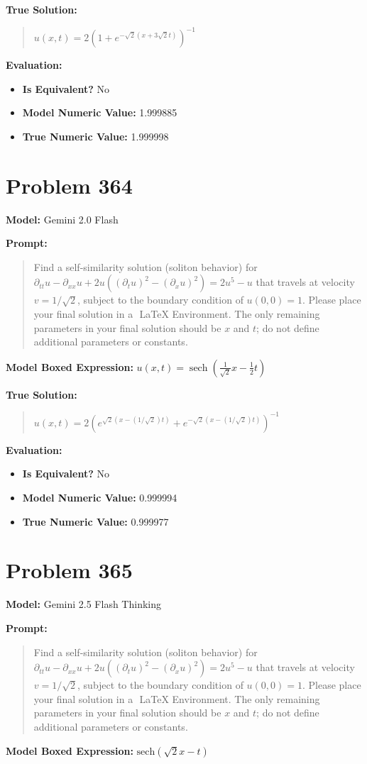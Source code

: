 \documentclass{article}
\begin{document}
{\textbf{True Solution:}
\begin{quote}
$u(x, t) = 2(1 + e^{-\sqrt{2}(x + 3\sqrt{2}t)})^{-1}$
\end{quote}

\textbf{Evaluation:}
\begin{itemize}
\item \textbf{Is Equivalent?} No
\item \textbf{Model Numeric Value:} 1.999885
\item \textbf{True Numeric Value:} 1.999998
\end{itemize}
\vspace{1cm}
\section*{Problem 364}
\textbf{Model:} Gemini 2.0 Flash

\textbf{Prompt:}
\begin{quote}
Find a self-similarity solution (soliton behavior) for $\partial_{tt} u - \partial_{xx} u + 2u ((\partial_t u)^2 - (\partial_x u)^2) = 2u^5 - u$ that travels at velocity $v = 1/\sqrt{2}$, subject to the boundary condition of $u(0, 0) = 1$. Please place your final solution in a $\boxed{}$ LaTeX Environment. The only remaining parameters in your final solution should be $x$ and $t$; do not define additional parameters or constants.
\end{quote}
\textbf{Model Boxed Expression:} $u(x,t) = \operatorname{sech}\left(\frac{1}{\sqrt{2}}x - \frac{1}{2}t\right)$

\textbf{True Solution:}
\begin{quote}
$u(x, t) = 2(e^{\sqrt{2}(x - (1/\sqrt{2})t)} + e^{-\sqrt{2}(x - (1/\sqrt{2})t)})^{-1}$
\end{quote}

\textbf{Evaluation:}
\begin{itemize}
\item \textbf{Is Equivalent?} No
\item \textbf{Model Numeric Value:} 0.999994
\item \textbf{True Numeric Value:} 0.999977
\end{itemize}
\vspace{1cm}
\section*{Problem 365}
\textbf{Model:} Gemini 2.5 Flash Thinking

\textbf{Prompt:}
\begin{quote}
Find a self-similarity solution (soliton behavior) for $\partial_{tt} u - \partial_{xx} u + 2u ((\partial_t u)^2 - (\partial_x u)^2) = 2u^5 - u$ that travels at velocity $v = 1/\sqrt{2}$, subject to the boundary condition of $u(0, 0) = 1$. Please place your final solution in a $\boxed{}$ LaTeX Environment. The only remaining parameters in your final solution should be $x$ and $t$; do not define additional parameters or constants.
\end{quote}
\textbf{Model Boxed Expression:} $\text{sech}(\sqrt{2}x - t)$

}
\end{document}
